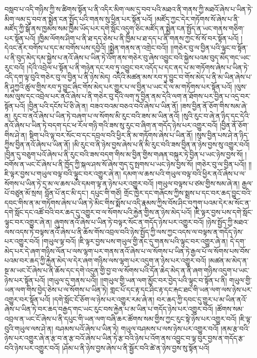 བསླབ་པ་འདི་གཉིས་ཀྱི་ས་ཚིགས་སྟོན་པ་ནི་འདིར་མིག་ལམ་དུ་བབ་པའི་མཐའ་ནི་གནས་ཀྱི་མཐའོ་ཞེས་པ་ཡིན་ཏེ་མིག་ལམ་དུ་བབ་ན་སྨྱེན་ངན་སྤྱོད་པའི་གནས་སུ་ཕྱིན་པར་སྟོན་པའོ། །མཛོད་ཀྱང་དེར་གཏོགས་སོ་ཞེས་པ་ནི་མཛོད་ཀྱི་སྒོ་ནས་ཁྱམས་སམ་ཁྱིམ་ཡོད་པར་དགེ་སློང་འདུག་ཅིང་མཛོད་ན་སྨྱེན་ངན་སྤྱོད་ན་ཡང་གནས་གཅིག་པར་སྟོན་པའོ། །ཁྱིམ་ལོགས་ཤིག་པ་ནི་ཐ་དད་ཅེས་པ་ནི་ཁྱིམ་པ་ཐ་དད་པ་ནི་གནས་ཀྱང་སོ་སོ་བར་སྟོན་པའོ། །དེའང་ནོར་བགོས་པ་དང་མ་བགོས་པས་དབྱེའོ། །སྨྱེན་གནས་ན་འགྲེང་བའོ།། །།གཅེར་བུ་ལ་བྱིན་པའི་ལྟུང་བ་སྟོན་པ་ནི་བུད་མེད་དམ་སྐྱེས་པ་ནའོ་ཞེས་པ་ཡིན་ཏེ་འོག་ནས་གཅེར་བུ་ཞེས་འབྱུང་བའི་སྐྱེས་པའམ་བུད་མེད་གང་ཡང་རུང་བའོ། །དེའི་འབྲེལ་པ་སྟོན་པ་ནི་གཉེན་དང་རབ་ཏུ་འབྱུང་བར་འདོད་པ་དང་ནད་པ་མ་གཏོགས་ཞེས་པ་ཡིན་ཏེ་འདི་དག་ལྟ་བུའི་གཅེར་བུ་ལ་བྱིན་པ་ནི་ཉེས་མེད། འདིའི་མཚན་མས་རབ་ཏུ་བྱུང་བ་གོས་མེད་པ་ནི་མ་ཡིན་ཞེས་པ་ནི་ཤཱཀྱའི་ཚུལ་གྱིས་རབ་ཏུ་བྱུང་ཞིང་གོས་མེད་པར་གྱུར་པ་ལ་བྱིན་པ་ཡང་དེ་ལ་མ་གཏོགས་པར་སྟོན་པའོ། །ལུས་སམ་ལུས་དང་འབྲེལ་པར་ནའོ་ཞེས་པ་ནི་གཅེར་བུ་དེའི་ལག་ཏུ་བྱིན་ནམ་དེའི་ལག་ན་ཐོགས་པར་བྱིན་པ་འདྲ་བར་སྟོན་པའོ། །བྱིན་པའི་དངོས་པོ་ཅི་ཞེ་ན། བཟའ་བའམ་བཅའ་བའོ་ཞེས་པ་ཡིན་ནོ། །ཟས་བྱིན་ནོ་ཅོག་གིས་སམ་ཞེ་ན། རུང་བ་ནའོ་ཞེས་པ་ཡིན་ཏེ་བཞག་པ་ལ་སོགས་མི་རུང་བའི་ཟས་མ་ཡིན་ནའོ། །སུའི་རུང་བ་ཞེ་ན་ཉིད་དང་དེའི་ནའོ་ཞེས་པ་ཡིན་ཏེ་བདག་དང་ཕ་རོལ་གཉི་གའི་ཟས་སུ་རུང་བ་ཞིག་ན་གདོད་ཉེས་པར་འགྱུར་བའོ། །བྱིན་ནོ་ཅོག་གིས་ཤེ་ན། སྡིག་པའི་ལྟ་བར་སོང་བ་དང་དབྲལ་བའི་ཕྱིར་ནི་མ་གཏོགས་ཞེས་པ་ཡིན་ནོ། །སུས་བྱིན་པས་ཤེ་ན་ཉིད་ཀྱིས་བྱིན་ནའོ་ཞེས་པ་ཡིན་ནོ། །མི་རུང་བ་ནི་ཉེས་བྱས་ཞེས་པ་ནི་མི་རུང་བའི་ཟས་བྱིན་ན་ཉེས་བྱས་སུ་འགྱུར་བའོ། །བྱིན་དུ་བཅུག་པའོ་ཞེས་པ་ནི་རུང་བའི་ཟས་བདག་གིས་མ་བྱིན་གྱིས་གཞན་བསྐུར་ཏེ་བྱིན་པ་ཡང་ཉེས་བྱས་སོ། །བགོས་ན་ཡང་ངོ་ཞེས་པ་ནི་ཁྱོད་ཀྱི་སྐལ་ཤས་སོ་ཞེས་གུད་དུ་སྤགས་པ་ཡང་ཉེས་བྱས་སོ། །གཅེར་བུ་ལ་བྱིན་པའོ།། །།ཇི་ལྟར་བྱས་པ་གཡུལ་བལྟ་བའི་ལྟུང་བར་འགྱུར་ཞེ་ན། དམག་ལ་ཆས་པའི་གཡུལ་བལྟ་བའི་ཕྱིར་ནའོ་ཞེས་པ་ལ་སོགས་པ་ཡིན་ཏེ་དྲ་མ་ལ་ཆས་པའི་དམག་ལྟ་ན་ཉེས་པར་འགྱུར་བའོ། །གཡུལ་བལྟས་པ་ཙམ་གྱིས་སམ་ཞེ་ན། རྒྱལ་པོ་བཙུན་མོ་སྲས། བློན་པོ་ནང་མི་དང་། དཔུང་གི་གཙོ། གྲོང་ཁྱེར་དང་གཞོངས་ཀྱིས་སྨྲས་པ་དང་བར་ཆད་བྱུང་བའི་དབང་གིས་ན་མ་གཏོགས་ཞེས་པ་ཡིན་ཏེ་མིང་གིས་སྨོས་པ་འདི་རྣམས་ཀྱིས་བོས་ཤིང་བཀུག་པའམ་དེར་མ་སོང་ན་དགེ་སློང་དང་འཚོ་བའི་བར་ཆད་དུ་འགྱུར་བ་ལ་སོགས་པའི་རྐྱེན་གྱིས་ན་ཉེས་མེད་པའོ། །ཇི་ལྟར་བྱས་པས་དགེ་སློང་ལྟུང་བར་འགྱུར་ཞེ་ན། ཞུགས་ནའོ་ཞེས་པ་ཡིན་ཏེ་བལྟར་སོང་ན་གདོད་ཉེས་པར་འགྱུར་བའོ། །ཉེས་སྤྱོད་ཀྱི་མཐའ་ལས་འདས་ཏེ་བལྟས་ནའོ་ཞེས་པ་ནི་ཆོས་གོས་འབྲལ་བའི་ཉེས་སྤྱོད་ཀྱི་ལས་ཀྱང་འདས་ལ་བལྟས་ན་གདོད་ཉེས་པར་འགྱུར་བའོ། །གཡུལ་ལྟ་བའོ། །ཇི་ལྟར་བྱས་པས་གཡུལ་གྱི་ནང་དུ་གནས་པའི་ལྟུང་བར་འགྱུར་ཞེ་ན། དེ་དག་མེད་པར་དེ་ཞག་གཉིས་ལོན་པ་ལས་ལྷག་པར་གནས་ནའོ་ཞེས་པ་ལ་སོགས་པ་ཡིན་ཏེ་རྒྱལ་པོ་ལ་སོགས་པས་བོས་པའམ་བར་ཆད་ཀྱི་རྐྱེན་མེད་ལ་དེར་ཞག་གཉིས་ལས་ལྷག་པར་འདུག་ན་ཉེས་པར་འགྱུར་བའོ། །མཚན་མ་མེད་ན་སྔ་མ་ཡང་ངོ་ཞེས་པ་ནི་ཆོས་དང་དགེ་འདུན་གྱི་བྱ་བ་ལ་སོགས་པའི་དོན་ཆེད་མེད་ན་ནི་ཞག་གཉིས་འདུག་པ་ཡང་ཉེས་པར་སྟོན་པའོ། །གཡུལ་དུ་གནས་པའོ།། །།གཡུལ་གྱི་ཡན་ལག་མྱོང་བར་བྱེད་པའི་ལྟུང་བ་སྟོན་པ་ནི། གཡུལ་གྱི་ཡན་ལག་གིས་བྱེད་ཅེས་པ་ལ་སོགས་པ་ཡིན་ཏེ། གླང་པོ་དང་རྟ་དང་ཤིང་རྟ་དང་རྐང་ཐང་གི་ཡན་ལག་ལས་ཉེས་པར་འགྱུར་བར་སྟོན་པའོ། །དགེ་སློང་ངོ་ཅོག་ལ་ཉེས་པར་འགྱུར་རམ་ཞེ་ན། བར་ཆད་ཀྱི་དབང་དུ་གྱུར་པ་མ་ཡིན་ནའོ་ཞེས་པ་ཡིན་ཏེ་བར་ཆད་བརྒྱད་གང་ཡང་རུང་བས་རྐྱེན་པ་མ་ཡིན་པ་གདོད་ཉེས་པར་འགྱུར་བའོ། །ཚོགས་སམ་འབྲལ་ན་ཡང་ངོ་ཞེས་པ་ནི་དཔུང་གི་ཡན་ལག་བཞི་ཆར་ཚོགས་སམ་གྱིས་ཀྱང་རུང་སྟེ་ཉེས་པར་འགྱུར་བའོ། །ཇི་ལྟ་བུའི་གཡུལ་ལས་ཤེ་ན། བཤམས་པའོ་ཞེས་པ་ཡིན་ཏེ། གཡུལ་བཤམས་པ་ལས་ཉེས་པར་འགྱུར་བའོ། །ནམ་རྩ་བའི་ཉེས་པར་འགྱུར་ཞེ་ན་རྩ་བ་ན་རྩ་བའོ་ཞེས་པ་ཡིན་ཏེ་རྩ་བའི་ཉེས་པ་འོག་ནས་འབྱུང་བ་ལྟ་བུར་བྱས་ན་གདོད་རྩ་བའི་ཉེས་པར་འགྱུར་བའོ། །ཤོམ་པ་ནི་ཉེས་བྱས་ཞེས་པ་ནི་སྦྱོར་བའི་ཚེ་ན་ཉེས་བྱས་སུ་སྟོན་པའོ། 